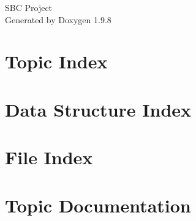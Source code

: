 \documentclass[twoside]{book}
\newcommand{\+}{\discretionary{\mbox{\scriptsize$\hookleftarrow$}}{}{}}
\newcommand{\clearemptydoublepage}{%
    \newpage{\pagestyle{empty}\cleardoublepage}%
  }
\begin{document}
  \raggedbottom
    \hypersetup{pageanchor=false,
                bookmarksnumbered=true,
                pdfencoding=unicode
               }
  \begin{titlepage}
  \vspace*{7cm}
  \begin{center}%
  {\Large SBC Project}\\
  \vspace*{1cm}
  {\large Generated by Doxygen 1.9.8}\\
  \end{center}
  \end{titlepage}
  \clearemptydoublepage
  \tableofcontents
  \clearemptydoublepage
  \hypersetup{pageanchor=true}



\chapter{Topic Index}

\chapter{Data Structure Index}

\chapter{File Index}

\chapter{Topic Documentation}




\end{document}
